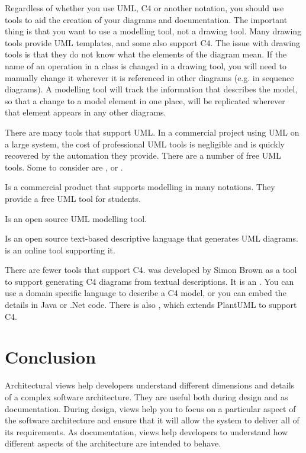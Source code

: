Regardless of whether you use UML, C4 or another notation, you should use tools to aid the creation of your diagrams and documentation.
The important thing is that you want to use a modelling tool, not a drawing tool.
Many drawing tools provide UML templates, and some also support C4.
The issue with drawing tools is that they do not know what the elements of the diagram mean.
If the name of an operation in a class is changed in a drawing tool, you will need to manually change it wherever it is referenced in other diagrams
(e.g. in sequence diagrams).
A modelling tool will track the information that describes the model, so that a change to a model element in one place,
will be replicated wherever that element appears in any other diagrams.

There are many tools that support UML.
In a commercial project using UML on a large system, the cost of professional UML tools is negligible and is quickly recovered by the automation they provide.
There are a number of free UML tools. Some to consider are ,
 or .
 \begin{description}[nosep]
    \item[Astah] Is a commercial product that supports modelling in many notations. They provide a free UML tool for students.
    \item[ModelIO] Is an open source UML modelling tool.
    \item[PlantUML] Is an open source text-based descriptive language that generates UML diagrams.
                               is an online tool supporting it.
\end{description}

There are fewer tools that support C4.
 was developed by Simon Brown as a tool to support generating C4 diagrams from textual descriptions.
It is an .
You can use a domain specific language to describe a C4 model, or you can embed the details in Java or .Net code.
There is also , which extends PlantUML to support C4.

\section{Conclusion}
Architectural views help developers understand different dimensions and details of a complex software architecture.
They are useful both during design and as documentation.
During design, views help you to focus on a particular aspect of the software architecture and ensure that it will allow the system to deliver all of its requirements.
As documentation, views help developers to understand how different aspects of the architecture are intended to behave.


